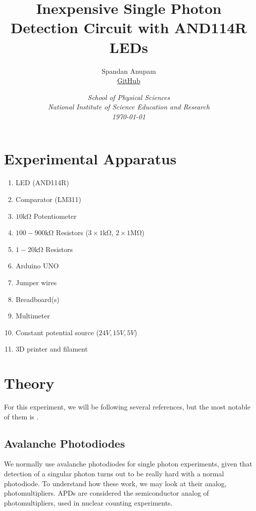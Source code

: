 \documentclass{double}
\begin{document}
\title{Inexpensive Single Photon Detection Circuit with AND114R LEDs}
\author{Spandan Anupam\\%
\href{https://github.com/surelynottrue/}{GitHub}}
\date{%
	\small\itshape School of Physical Sciences\\%
	\normalfont National Institute of Science Education and Research\\[2ex]%
	\normalsize\today}
\maketitle

\begin{multicols*}{2}
\section{Experimental Apparatus}
\begin{enumerate}
	\item LED (AND114R)
	\item Comparator (LM311)
	\item $10\si{\kilo\ohm}$ Potentiometer
	\item $100-900\si{\kilo\ohm}$ Resistors ($3\times1\si{\kilo\ohm}$, $2\times1\si{\mega\ohm}$) 
	\item $1-20\si{\kilo\ohm}$ Resistors
	\item Arduino UNO
	\item Jumper wires
	\item Breadboard(s)
	\item Multimeter
	\item Constant potential source ($24\si{V}, 15\si{V}, 5\si{V}$)
	\item 3D printer and filament
\end{enumerate}

\section{Theory}
For this experiment, we will be following several references, but the most notable of them is \cite{mcann}.
\label{theory}
\subsection{Avalanche Photodiodes}
We normally use avalanche photodiodes for single photon experiments, given that detection of a singular photon turns out to be really hard with a normal photodiode. To understand how these work, we may look at their analog, photomultipliers. APDs are considered the semiconductor analog of photomultipliers, used in nuclear counting experiments.


\end{multicols*}
\end{document}
